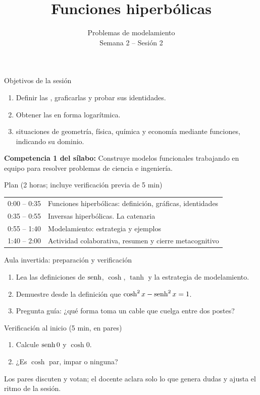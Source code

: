 \documentclass[10pt,aspectratio=169]{beamer}
\title[Hiperbólicas y modelamiento]{Funciones hiperbólicas}
\subtitle{Problemas de modelamiento\\[2pt]\small Semana 2 -- Sesión 2}
\begin{document}
\begin{frame}
  \titlepage
\end{frame}

\begin{frame}{Objetivos de la sesión}
  \begin{enumerate}
    \item Definir las , graficarlas y probar sus identidades.
    \item Obtener las  en forma logarítmica.
    \item {} situaciones de geometría, física, química y economía mediante funciones, indicando su dominio.
  \end{enumerate}
  \vspace{1mm}
  {\small\textbf{Competencia 1 del sílabo:} Construye modelos funcionales trabajando en equipo para resolver problemas de ciencia e ingeniería.}
  \begin{block}{Plan (2 horas; incluye verificación previa de 5 min)}
    \begin{tabular}{ll}
      0:00 -- 0:35 & Funciones hiperbólicas: definición, gráficas, identidades\\
      0:35 -- 0:55 & Inversas hiperbólicas. La catenaria\\
      0:55 -- 1:40 & Modelamiento: estrategia y ejemplos\\
      1:40 -- 2:00 & Actividad colaborativa, resumen y cierre metacognitivo
    \end{tabular}
  \end{block}
\end{frame}

\begin{frame}{Aula invertida: preparación y verificación}
  \small
  \begin{previa}
    \begin{enumerate}
      \item Lea las definiciones de $\operatorname{senh}$, $\cosh$, $\tanh$ y la estrategia de modelamiento.
      \item Demuestre desde la definición que $\cosh^2x-\operatorname{senh}^2x=1$.
      \item Pregunta guía: ¿qué forma toma un cable que cuelga entre dos postes?
    \end{enumerate}
  \end{previa}
  \begin{block}{Verificación al inicio (5 min, en pares)}
    \begin{enumerate}
      \item Calcule $\operatorname{senh} 0$ y $\cosh 0$.
      \item ¿Es $\cosh$ par, impar o ninguna?
    \end{enumerate}
    Los pares discuten y votan; el docente aclara solo lo que genera dudas y ajusta el ritmo de la sesión.
  \end{block}
\end{frame}
\end{document}
